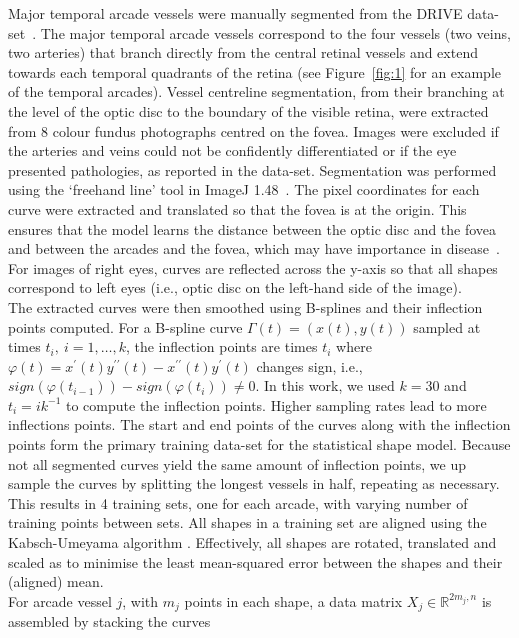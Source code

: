 \documentclass[11pt,]{article}
\begin{document}
Major temporal arcade vessels were manually segmented from the DRIVE data-set~\cite{Staal_2004}.
The major temporal arcade vessels correspond to the four
vessels (two veins, two arteries) that branch directly from the
central retinal vessels and extend towards each temporal quadrants of
the retina (see Figure~\ref{fig:1} for an example of the temporal
arcades).  Vessel centreline segmentation, from their branching at
the level of the optic disc to the boundary of the visible retina,
were extracted from 8 colour fundus photographs centred on the fovea.
Images were excluded if the arteries and veins could not be
confidently differentiated or if the eye presented pathologies, as
reported in the data-set.  Segmentation was performed using the
`freehand line' tool in ImageJ 1.48~\cite{Schneider2012}.  The pixel
coordinates for each curve were extracted and translated so that the
fovea is at the origin.  This ensures that the model learns the
distance between the optic disc and the fovea and between the arcades
and the fovea, which may have importance in disease~\cite{Arslan2021}.
For images of right eyes, curves are reflected across the y-axis so that all shapes correspond to left eyes
(i.e., optic disc on the left-hand side of the image).
\\
The extracted curves were then smoothed using B-splines and their
inflection points computed. For a B-spline curve
$\Gamma(t)=\left(x(t),y(t)\right)$ sampled at times $t_i,\ i=1,…,k$,
the inflection points are times $t_i$ where
$\varphi(t)=x^\prime(t)y^{\prime\prime}(t)-x^{\prime\prime}(t)y^\prime(t)$
changes sign, i.e.,
$sign(\varphi(t_{i-1}))-sign(\varphi(t_i))\neq0$. In this work, we
used $k=30$ and $t_i=i k^{-1}$ to compute the inflection
points. Higher sampling rates lead to more inflections points. The
start and end points of the curves along with the inflection points
form the primary training data-set for the statistical shape
model. Because not all segmented curves yield the same amount of
inflection points, we up sample the curves by splitting the longest
vessels in half, repeating as necessary. This results in 4 training
sets, one for each arcade, with varying number of training points
between sets. All shapes in a training set are aligned using the
Kabsch-Umeyama algorithm \cite{Umeyama1991}. Effectively, all shapes are
rotated, translated and scaled as to minimise the least mean-squared
error between the shapes and their (aligned) mean.
\\
For arcade vessel $j$, with $m_j$ points in each shape, a data matrix
$X_j\in\mathbb R^{2m_j,n}$ is assembled by stacking the curves
\end{document}
